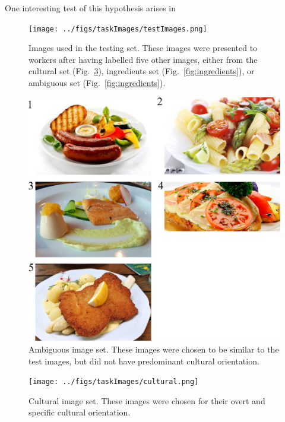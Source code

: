 \documentclass[letterpaper]{article}
\begin{document}
One interesting test of this hypothesis arises in 
\begin{figure}
	\texttt{[image: ../figs/taskImages/testImages.png]}
	\caption{Images used in the testing set.  These images were presented to
	workers after having labelled five other images, either from the cultural
	set (Fig.~\ref{fig:cultural}), ingredients set (Fig.~\ref{fig:ingredients}), or ambiguous set (Fig.~\ref{fig:ingredients}).}
	\label{fig:testImages}
\end{figure}

\begin{figure}
	\includegraphics[scale=1.00]{../figs/taskImages/ambiguous.png}
	\caption{Ambiguous image set.  These images were chosen to be similar to 
	the test images, but did not have predominant cultural orientation.}
	\label{fig:ambiguous}
\end{figure}

\begin{figure}
	\texttt{[image: ../figs/taskImages/cultural.png]}
	\caption{Cultural image set.  These images were chosen for their overt and
	specific cultural orientation.}
	\label{fig:cultural}
\end{figure}
\end{document}
